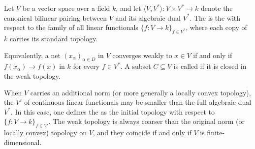\begin{definition} \label{definition:weak_topology_on_a_vector_space}

    Let $V$ be a vector space over a field $k$, and let $\langle V, V^* \rangle : V \times V^* \to k$ denote the canonical bilinear pairing between $V$ and its algebraic dual $V^*$. The  is the  with respect to the family of all linear functionals $\{f : V \to k\}_{f \in V^*}$, where each copy of $k$ carries its standard topology.

    Equivalently, a net $(x_\alpha)_{\alpha \in D}$ in $V$ converges weakly to $x \in V$ if and only if $f(x_\alpha) \to f(x)$ in $k$ for every $f \in V^*$. A subset $C \subseteq V$ is called  if it is closed in the weak topology.

    When $V$ carries an additional norm (or more generally a locally convex topology), the  $V'$ of continuous linear functionals may be smaller than the full algebraic dual $V^*$. In this case, one defines the  as the initial topology with respect to $\{f : V \to k\}_{f \in V'}$. The weak topology is always coarser than the original norm (or locally convex) topology on $V$, and they coincide if and only if $V$ is finite-dimensional.
\end{definition}
